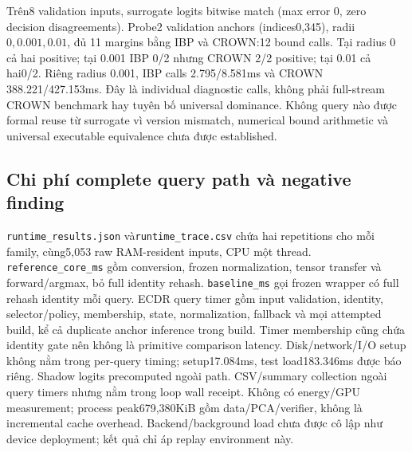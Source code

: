 \documentclass[11pt,a4paper]{article}
\newcommand{\code}[1]{{\small\ttfamily\nolinkurl{#1}}}
\theoremstyle{remark}
\begin{document}
Trên8 validation inputs, surrogate logits bitwise match (max error 0,
zero decision disagreements). Probe2 validation anchors (indices0,345),
radii$0,0.001,0.01$, đủ 11 margins bằng IBP và CROWN:12 bound calls.
Tại radius 0 cả hai positive; tại 0.001 IBP 0/2 nhưng CROWN 2/2 positive;
tại 0.01 cả hai0/2. Riêng radius 0.001, IBP calls 2.795/8.581ms và
CROWN 388.221/427.153ms. Đây là individual diagnostic calls, không phải
full-stream CROWN benchmark hay tuyên bố universal dominance. Không query
nào được formal reuse từ surrogate vì version mismatch, numerical bound
arithmetic và universal executable equivalence chưa được established.

\subsection{Chi phí complete query path và negative finding}
\code{runtime_results.json} và\code{runtime_trace.csv} chứa hai repetitions
cho mỗi family, cùng5,053 raw RAM-resident inputs, CPU một thread.
\code{reference_core_ms} gồm conversion, frozen normalization, tensor transfer
và forward/argmax, bỏ full identity rehash. \code{baseline_ms} gọi frozen
wrapper có full rehash identity mỗi query. ECDR query timer gồm input validation,
identity, selector/policy, membership, state, normalization, fallback và mọi
attempted build, kể cả duplicate anchor inference trong build.
Timer membership cũng chứa identity gate nên không là primitive comparison
latency. Disk/network/I/O setup không nằm trong per-query timing; setup17.084ms,
test load183.346ms được báo riêng. Shadow logits precomputed ngoài path.
CSV/summary collection ngoài query timers nhưng nằm trong loop wall receipt.
Không có energy/GPU measurement; process peak679,380KiB gồm data/PCA/verifier,
không là incremental cache overhead. Backend/background load chưa được cô lập
như device deployment; kết quả chỉ áp replay environment này.
\end{document}
